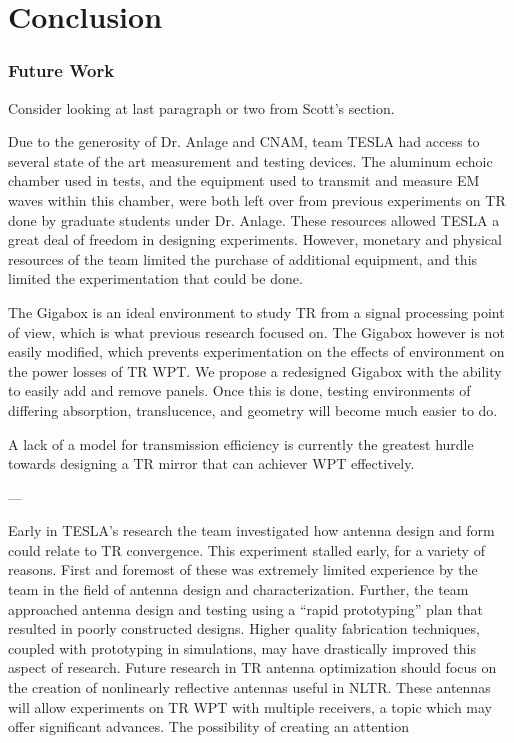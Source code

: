 \chapter{Conclusion}

\label{ch:conclusion}


\subsection{Future Work}

Consider looking at last paragraph or two from Scott’s section.

Due to the generosity of Dr. Anlage and CNAM, team TESLA had access to several state of the art measurement and testing devices.  The aluminum echoic chamber used in tests, and the equipment used to transmit and measure EM waves within this chamber, were both left over from previous experiments on TR done by graduate students under Dr. Anlage.  These resources allowed TESLA a great deal of freedom in designing experiments.  However, monetary and physical resources of the team limited the purchase of additional equipment, and this limited the experimentation that could be done.

The Gigabox is an ideal environment to study TR from a signal processing point of view, which is what previous research focused on.  The Gigabox however is not easily modified, which prevents experimentation on the effects of environment on the power losses of TR WPT.  We propose a redesigned Gigabox with the ability to easily add and remove panels.  Once this is done, testing environments of differing absorption, translucence, and geometry will become much easier to do.

A lack of a model for transmission efficiency is currently the greatest hurdle towards designing a TR mirror that can achiever WPT effectively.

---

	Early in TESLA’s research the team investigated how antenna design and form could relate to TR convergence.  This experiment stalled early, for a variety of reasons.  First and foremost of these was extremely limited experience by the team in the field of antenna design and characterization.  Further, the team approached antenna design and testing using a “rapid prototyping” plan that resulted in poorly constructed designs.  Higher quality fabrication techniques, coupled with prototyping in simulations, may have drastically improved this aspect of research.
	Future research in TR antenna optimization should focus on the creation of nonlinearly reflective antennas useful in NLTR.  These antennas will allow experiments on TR WPT with multiple receivers, a topic which may offer significant advances.  The possibility of creating an attention

